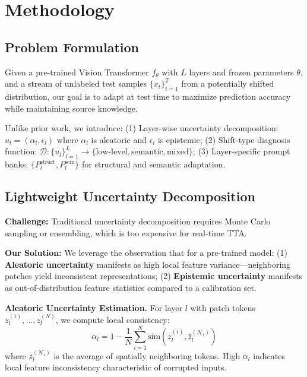 \documentclass[11pt,a4paper]{article}
\begin{document}
\section{Methodology}

\subsection{Problem Formulation}

Given a pre-trained Vision Transformer $f_\theta$ with $L$ layers and frozen parameters $\theta$, and a stream of unlabeled test samples $\{x_t\}_{t=1}^T$ from a potentially shifted distribution, our goal is to adapt at test time to maximize prediction accuracy while maintaining source knowledge.

Unlike prior work, we introduce: (1) Layer-wise uncertainty decomposition: $u_l = (\alpha_l, \epsilon_l)$ where $\alpha_l$ is aleatoric and $\epsilon_l$ is epistemic; (2) Shift-type diagnosis function: $\mathcal{D}: \{u_l\}_{l=1}^L \rightarrow \{\text{low-level}, \text{semantic}, \text{mixed}\}$; (3) Layer-specific prompt banks: $\{P_l^{\text{struct}}, P_l^{\text{sem}}\}$ for structural and semantic adaptation.

\subsection{Lightweight Uncertainty Decomposition}

\textbf{Challenge:} Traditional uncertainty decomposition requires Monte Carlo sampling or ensembling, which is too expensive for real-time TTA.

\textbf{Our Solution:} We leverage the observation that for a pre-trained model: (1) \textbf{Aleatoric uncertainty} manifests as high local feature variance---neighboring patches yield inconsistent representations; (2) \textbf{Epistemic uncertainty} manifests as out-of-distribution feature statistics compared to a calibration set.

\textbf{Aleatoric Uncertainty Estimation.} For layer $l$ with patch tokens $z_l^{(1)}, ..., z_l^{(N)}$, we compute local consistency:
\begin{equation}
\alpha_l = 1 - \frac{1}{N}\sum_{i=1}^N \text{sim}(z_l^{(i)}, \bar{z}_l^{(\mathcal{N}_i)})
\end{equation}
where $\bar{z}_l^{(\mathcal{N}_i)}$ is the average of spatially neighboring tokens. High $\alpha_l$ indicates local feature inconsistency characteristic of corrupted inputs.
\end{document}
